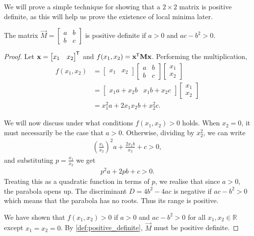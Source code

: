 We will prove a simple technique for showing that a $2 \times 2$ matrix is positive definite, as this will help us prove the existence of local minima later.
\begin{theorem}
    \label{thm:positive_definite_2_by_2}
    The matrix $\vec{M} = \begin{bmatrix}
        a & b \\ b & c
    \end{bmatrix}$
    is positive definite if
    $a > 0$ and 
    $ac - b^2>0$.
\end{theorem}
\begin{proof}
    Let $\mathbf{x} = \begin{bmatrix}
        x_1 & x_2
    \end{bmatrix}^{\mkern-1.5mu\mathsf{T}}$
    and $f(x_1, x_2) = \mathbf{x}^{\mkern-1.5mu\mathsf{T}} \mathbf{M} \mathbf{x}$.
    Performing the multiplication,
    \begin{align*}
        f(x_1, x_2)
        &= 
        \begin{bmatrix}
            x_1 & x_2
        \end{bmatrix}
        \begin{bmatrix}
            a & b \\
            b & c
        \end{bmatrix}
        \begin{bmatrix}
            x_1 \\ x_2
        \end{bmatrix} \\
        &=
        \begin{bmatrix}
            x_1 a + x_2 b & x_1 b + x_2 c
        \end{bmatrix}
        \begin{bmatrix}
            x_1 \\ x_2
        \end{bmatrix} \\
        &=
            x_1^2 a + 2 x_1 x_2 b + x_2^2 c.
    \end{align*}

    We will now discuss under what conditions
    $f(x_1, x_2) > 0$
    holds.
    When $x_2=0$, it must necessarily be the case that $a>0$.
    Otherwise, dividing by $x_2^2$, we can write
    \begin{align*}
        \left(\frac{x_1}{x_2}\right)^2 a + \frac{2 x_1 b}{x_2} + c > 0,
    \end{align*}
    and substituting $p = \frac{x_1}{x_2}$ we get
    \begin{align*}
        p^2 a + 2pb + c > 0.
    \end{align*}
    Treating this as a quadratic function in terms of $p$, we realise that since $a>0$, the parabola opens up.
    The discriminant $D=4b^2 - 4ac$ is negative if $ac-b^2>0$ which means that the parabola has no roots. 
    Thus its range is positive.

    We have shown that $f(x_1, x_2)>0$ if $a>0$ and $ac-b^2>0$ for all $x_1,x_2\in \mathbb{R}$ except $x_1=x_2=0$.
    By \ref{def:positive_definite}, $\vec{M}$ must be positive definite.
\end{proof}

